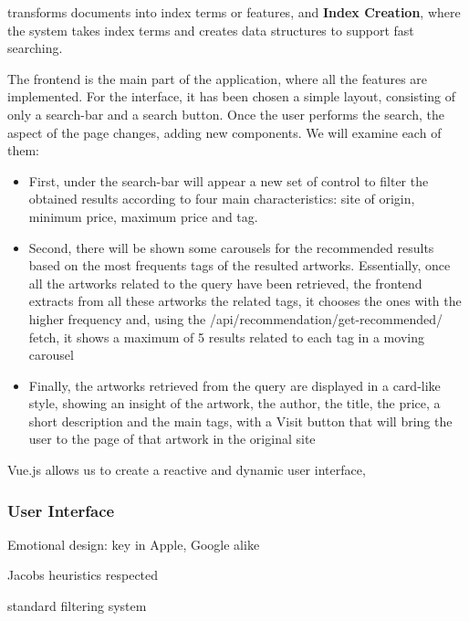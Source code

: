 \documentclass[12pt]{spieman}  %
\begin{document}
\begin{spacing}{1}
    transforms documents into index terms or features, and \textbf{Index Creation}, where the
    system takes index terms and creates data structures to support fast searching.

    The frontend is the main part of the application, where all the features are implemented.\newline
    For the interface, it has been chosen a simple layout, consisting of only a search-bar and a search button. Once the user performs the search, the aspect of the page changes, adding new components. We will examine each of them:
    \begin{itemize}
        \item First, under the search-bar will appear a new set of control to filter the obtained results according to four main characteristics: site of origin, minimum price, maximum price and tag.
        \item Second, there will be shown some carousels for the recommended results based on the most frequents tags of the resulted artworks. Essentially, once all the artworks related to the query have been retrieved, the frontend extracts from all these artworks the related tags, it chooses the ones with the higher frequency and, using the /api/recommendation/get-recommended/ fetch, it shows a maximum of 5 results related to each tag in a moving carousel
        \item Finally, the artworks retrieved from the query are displayed in a card-like style, showing an insight of the artwork, the author, the title, the price, a short description and the main tags, with a Visit button that will bring the user to the page of that artwork in the original site
    \end{itemize}

    Vue.js allows us to create a reactive and dynamic user interface,

    \subsubsection{User Interface}\label{sec:ui}

    Emotional design: key in Apple, Google alike

    Jacobs heuristics respected

    standard filtering system



\end{spacing}
\end{document}
